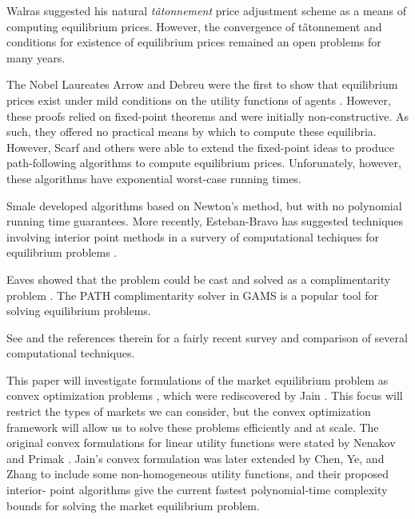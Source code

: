 \documentclass[12pt]{article}
\newcommand{\tatonnement}{t\^atonnement}
\begin{document}
Walras suggested his natural \emph{\tatonnement{}} price adjustment scheme as a
means of computing equilibrium prices. However, the convergence of
\tatonnement{} and conditions for existence of equilibrium prices remained an
open problems for many years.

The Nobel Laureates Arrow and Debreu were the first to show that equilibrium
prices exist under mild conditions on the utility functions of agents
\cite{arrow1954existence}. However, these proofs relied on fixed-point theorems
\cite[see][]{border1989fixed}
and were initially non-constructive.
As such, they offered no practical means by which to compute these equilibria. 
However, Scarf and others 
\cite{scarf1967approximation,scarf1973computation,
scarf1982computation,eaves1972homotopies} were able to extend the fixed-point
ideas to produce path-following algorithms to compute equilibrium prices.
Unforunately, however, these algorithms have exponential worst-case running times.

Smale \cite{smale1976exchange,smale1976convergent} developed algorithms based
on Newton's method, but with no polynomial running time guarantees.
More recently, Esteban-Bravo has suggested techniques involving
interior point methods in a survery of computational techiques
for equilibrium problems \cite{esteban2004computing}.

Eaves \cite{eaves1976finite} showed that the problem could be cast and solved
as a complimentarity problem \cite{isac1992complementarity}. The PATH
\cite{ferris2008path,ferris2000complementarity,ferris2000homotopy}
complimentarity solver in GAMS \cite{rosenthal2004gams} is a popular tool for
solving equilibrium problems.

See \cite{codenotti2008experimental} and the references therein for a fairly
recent survey and comparison of several computational techniques.

This paper will investigate formulations of the market equilibrium problem as
convex optimization problems \cite{BoV:04}, which were rediscovered by Jain
\cite{jain2007polynomial}. This focus will restrict the types of markets we can
consider, but the convex optimization framework will allow us to solve these
problems efficiently and at scale. The original convex formulations for linear
utility functions were stated by Nenakov and Primak
\cite{nenakov1983algorithm}. Jain's convex formulation was later extended by
Chen, Ye, and Zhang \cite{chen2007note, chen2010equilibrium,ye2008path} to
include some non-homogeneous utility functions, and their proposed interior-
point algorithms give the current fastest polynomial-time complexity bounds
for solving the market equilibrium problem.
\end{document}
